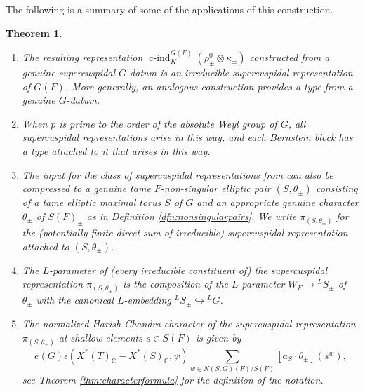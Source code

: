 \documentclass{article}
\def\C{\mathbb{C}}
\DeclareMathOperator{\cind}{c-ind}
\newtheorem{thm}{Theorem}[subsection]
\theoremstyle{definition}
\numberwithin{equation}{subsection}
\renewcommand{\-}{\hyp{}}
\begin{document}
 The following is a summary of some of the applications of this construction.

\begin{thm}
	\begin{enumerate}
		\item The resulting representation $\cind_K^{G(F)}(\rho^0_{\pm} \otimes \kappa_{\pm})$ constructed from a genuine supercuspidal $G$-datum is an irreducible supercuspidal representation of $G(F)$. More generally, an analogous construction provides a type from a genuine $G$-datum.
		\item When $p$ is prime to the order of the absolute Weyl group of $G$, all supercuspidal representations arise in this way, and each Bernstein block has a type attached to it that arises in this way.
\item The input for the class of supercuspidal representations from \cite{KalSLP} can also be compressed to a genuine tame $F$-non-singular elliptic pair $(S, \theta_{\pm})$ consisting of a tame elliptic maximal torus $S$ of $G$ and an appropriate genuine character $\theta_{\pm}$ of $S(F)_{\pm}$ as in Definition \ref{dfn:nonsingularpairs}. We write $\pi_{(S,\theta_{\pm})}$ for the (potentially finite direct sum of irreducible) supercuspidal representation attached to $(S,\theta_{\pm})$.
		\item The $L$-parameter of (every irreducible constituent of) the supercuspidal representation $\pi_{(S,\theta_\pm)}$ is the composition of the $L$-parameter $W_F \to {^LS}_\pm$ of $\theta_\pm$ with the canonical $L$\-embedding ${^LS}_\pm \hookrightarrow {^LG}$.
		\item The normalized Harish-Chandra character of the supercuspidal representation $\pi_{(S,\theta_{\pm})}$ at shallow elements $s \in S(F)$ is given by 
		\[ e(G)\epsilon(X^*(T)_\C-X^*(S)_\C,\psi) \sum_{w \in N(S,G)(F)/S(F)} [a_S \cdot \theta_\pm](s^w), \]
		see Theorem \ref{thm:characterformula} for the definition of the notation.
	\end{enumerate}
\end{thm}
\end{document}
